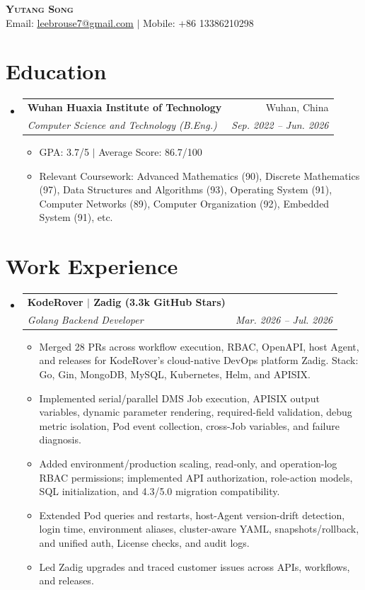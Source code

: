\documentclass[letterpaper,10pt]{article}
\makeatletter
\newcommand{\resumeItem}[1]{
  \item\small{
    {#1 \vspace{-2pt}}
  }
}
\newcommand{\resumeSubheading}[4]{
  \vspace{-2pt}\item
    \begin{tabular*}{0.97\textwidth}[t]{l@{\extracolsep{\fill}}r}
      \textbf{#1} & #2 \\
      \textit{\small#3} & \textit{\small #4} \\
    \end{tabular*}\vspace{-7pt}
}
\newcommand{\resumeSubHeadingListStart}{\begin{itemize}[leftmargin=0.15in, label={}]}
\newcommand{\resumeSubHeadingListEnd}{\end{itemize}}
\newcommand{\resumeItemListStart}{\begin{itemize}}
\newcommand{\resumeItemListEnd}{\end{itemize}\vspace{-5pt}}
\makeatother
\begin{document}
\begin{center}
    \textbf{\Huge \scshape Yutang Song} \\ \vspace{1pt}
    \small Email: \href{mailto:leebrouse7@gmail.com}{\underline{leebrouse7@gmail.com}} $|$
    Mobile: +86 13386210298
\end{center}


\section{Education}
  \resumeSubHeadingListStart
    \resumeSubheading
      {Wuhan Huaxia Institute of Technology}{Wuhan, China}
      {Computer Science and Technology (B.Eng.)}{Sep. 2022 -- Jun. 2026}
      \resumeItemListStart
        \resumeItem{GPA: 3.7/5 $|$ Average Score: 86.7/100}
        \resumeItem{Relevant Coursework: Advanced Mathematics (90), Discrete Mathematics (97), Data Structures and Algorithms (93), Operating System (91), Computer Networks (89), Computer Organization (92), Embedded System (91), etc.}
      \resumeItemListEnd
  \resumeSubHeadingListEnd


\section{Work Experience}
  \resumeSubHeadingListStart
    \resumeSubheading
      {KodeRover $|$ Zadig (3.3k GitHub Stars)}{}
      {Golang Backend Developer}{Mar. 2026 -- Jul. 2026}
      \resumeItemListStart
        \resumeItem{Merged 28 PRs across workflow execution, RBAC, OpenAPI, host Agent, and releases for KodeRover's cloud-native DevOps platform Zadig. Stack: Go, Gin, MongoDB, MySQL, Kubernetes, Helm, and APISIX.}
        \resumeItem{Implemented serial/parallel DMS Job execution, APISIX output variables, dynamic parameter rendering, required-field validation, debug metric isolation, Pod event collection, cross-Job variables, and failure diagnosis.}
        \resumeItem{Added environment/production scaling, read-only, and operation-log RBAC permissions; implemented API authorization, role-action models, SQL initialization, and 4.3/5.0 migration compatibility.}
        \resumeItem{Extended Pod queries and restarts, host-Agent version-drift detection, login time, environment aliases, cluster-aware YAML, snapshots/rollback, and unified auth, License checks, and audit logs.}
        \resumeItem{Led Zadig upgrades and traced customer issues across APIs, workflows, and releases.}
      \resumeItemListEnd
  \resumeSubHeadingListEnd
\end{document}
